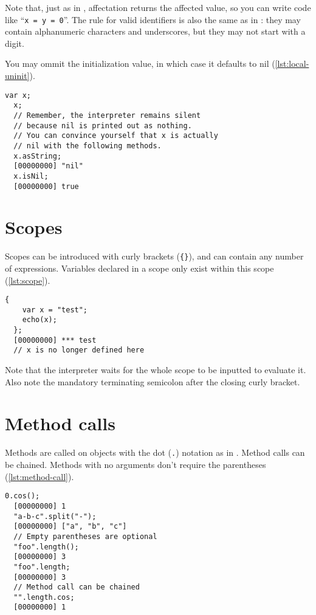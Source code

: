 \documentclass[openright,twoside,12pt]{report}
\newcommand{\lst}[1]{\autoref{lst:#1}}
\begin{document}
Note that, just as in \Cxx, affectation returns the affected value, so
you can write code like ``\lstinline|x = y = 0|''. The rule for valid
identifiers is also the same as in \Cxx: they may contain alphanumeric
characters and underscores, but they may not start with a digit.

You may ommit the initialization value, in which case it defaults to
nil (\lst{local-uninit}).

\begin{lstlisting}[caption=Variables initialization defaults to
  nil,label=lst:local-uninit]
  var x;
  x;
  // Remember, the interpreter remains silent
  // because nil is printed out as nothing.
  // You can convince yourself that x is actually
  // nil with the following methods.
  x.asString;
  [00000000] "nil"
  x.isNil;
  [00000000] true
\end{lstlisting}

\section{Scopes}

Scopes can be introduced with curly brackets (\texttt{\{\}}), and can
contain any number of expressions. Variables declared in a scope only
exist within this scope (\lst{scope}).

\begin{lstlisting}[caption=Scoping a variable,label=lst:scope]
  {
    var x = "test";
    echo(x);
  };
  [00000000] *** test
  // x is no longer defined here
\end{lstlisting}

Note that the interpreter waits for the whole scope to be inputted to
evaluate it. Also note the mandatory terminating semicolon after the
closing curly bracket.

\section{Method calls}

Methods are called on objects with the dot (\texttt{.}) notation as in
\Cxx. Method calls can be chained. Methods with no arguments don't
require the parentheses (\lst{method-call}).

\begin{lstlisting}[caption=Calling methods,label=lst:method-call]
  0.cos();
  [00000000] 1
  "a-b-c".split("-");
  [00000000] ["a", "b", "c"]
  // Empty parentheses are optional
  "foo".length();
  [00000000] 3
  "foo".length;
  [00000000] 3
  // Method call can be chained
  "".length.cos;
  [00000000] 1
\end{lstlisting}
\end{document}
